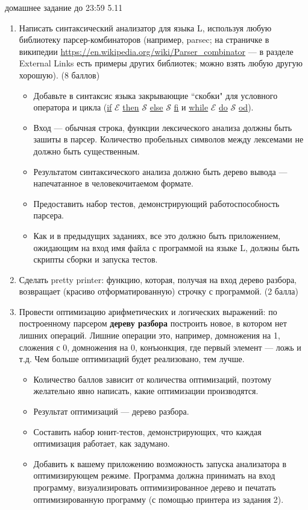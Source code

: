 \documentclass[12pt]{article}
\begin{document}

{\Large домашнее задание до 23:59 5.11}
\bigskip

\begin{enumerate}
  \item 
  {  Написать синтаксический анализатор для языка L, используя любую библиотеку парсер-комбинаторов (например, parsec; на страничке в википедии \url{https://en.wikipedia.org/wiki/Parser_combinator} --- в разделе External Links есть примеры других библиотек; можно взять любую другую хорошую). (8 баллов) 
  \begin{itemize}
    \item Добавьте в синтаксис языка закрывающие ``{скобки}" для условного оператора и цикла (\underline{if} $\mathcal{E}$ \underline{then} $\mathcal{S}$ \underline{else} $\mathcal{S}$ \underline{fi} и \underline{while} $\mathcal{E}$ \underline{do} $\mathcal{S}$ \underline{od}).
    \item Вход --- обычная строка, функции лексического анализа должны быть зашиты в парсер. Количество пробельных символов между лексемами не должно быть существенным. 
    \item Результатом синтаксического анализа должно быть дерево вывода — напечатанное в человекочитаемом формате.
    \item Предоставить набор тестов, демонстрирующий работоспособность парсера.
    \item Как и в предыдущих заданиях, все это должно быть приложением, ожидающим на вход имя файла с программой на языке L, должны быть скрипты сборки и запуска тестов.
  \end{itemize}
  }
  \item
  {
    Сделать pretty printer: функцию, которая, получая на вход дерево разбора, возвращает (красиво отформатированную) строчку с программой. (2 балла)
  }
  \item 
  {
    Провести оптимизацию арифметических и логических выражений: по построенному парсером \textbf{дереву разбора} построить новое, в котором нет лишних операций. Лишние операции это, например, домножения на 1, сложения с 0, домножения на 0, конъюнкция, где первый элемент --- ложь и т.д. Чем больше оптимизаций будет реализовано, тем лучше. 
    \begin{itemize}
      \item Количество баллов зависит от количества оптимизаций, поэтому желательно явно написать, какие оптимизации производятся.
      \item Результат оптимизаций --- дерево разбора. 
      \item Составить набор юнит-тестов, демонстрирующих, что каждая оптимизация работает, как задумано. 
      \item Добавить к вашему приложению возможность запуска анализатора в оптимизирующем режиме. Программа должна принимать на вход программу, визуализировать оптимизированное дерево и печатать оптимизированную программу (с помощью принтера из задания 2).
    \end{itemize}
  }
\end{enumerate}
\end{document}
